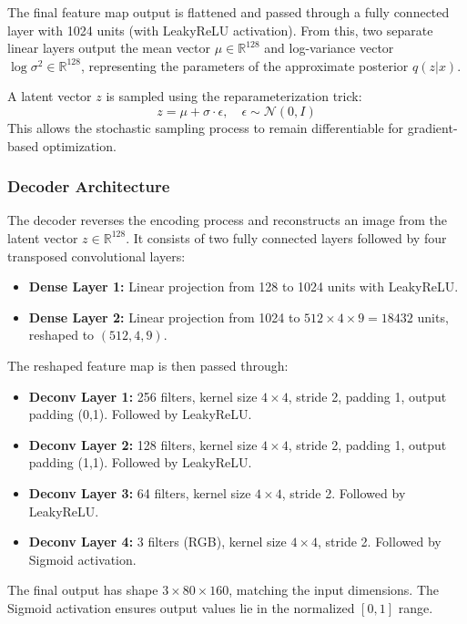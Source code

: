 The final feature map output is flattened and passed through a fully connected layer with 1024 units (with LeakyReLU activation). From this, two separate linear layers output the mean vector $\mu \in \mathbb{R}^{128}$ and log-variance vector $\log\sigma^2 \in \mathbb{R}^{128}$, representing the parameters of the approximate posterior $q(z|x)$.

A latent vector $z$ is sampled using the reparameterization trick:
\[
z = \mu + \sigma \cdot \epsilon, \quad \epsilon \sim \mathcal{N}(0, I)
\]
This allows the stochastic sampling process to remain differentiable for gradient-based optimization.

\subsubsection{Decoder Architecture} \label{subsubsec:vae_decoder}

The decoder reverses the encoding process and reconstructs an image from the latent vector $z \in \mathbb{R}^{128}$. It consists of two fully connected layers followed by four transposed convolutional layers:

\begin{itemize}
    \item \textbf{Dense Layer 1:} Linear projection from 128 to 1024 units with LeakyReLU.
    \item \textbf{Dense Layer 2:} Linear projection from 1024 to $512 \times 4 \times 9 = 18432$ units, reshaped to $(512, 4, 9)$.
\end{itemize}

The reshaped feature map is then passed through:

\begin{itemize}
    \item \textbf{Deconv Layer 1:} 256 filters, kernel size $4 \times 4$, stride 2, padding 1, output padding (0,1). Followed by LeakyReLU.
    \item \textbf{Deconv Layer 2:} 128 filters, kernel size $4 \times 4$, stride 2, padding 1, output padding (1,1). Followed by LeakyReLU.
    \item \textbf{Deconv Layer 3:} 64 filters, kernel size $4 \times 4$, stride 2. Followed by LeakyReLU.
    \item \textbf{Deconv Layer 4:} 3 filters (RGB), kernel size $4 \times 4$, stride 2. Followed by Sigmoid activation.
\end{itemize}

The final output has shape $3 \times 80 \times 160$, matching the input dimensions. The Sigmoid activation ensures output values lie in the normalized $[0,1]$ range.

